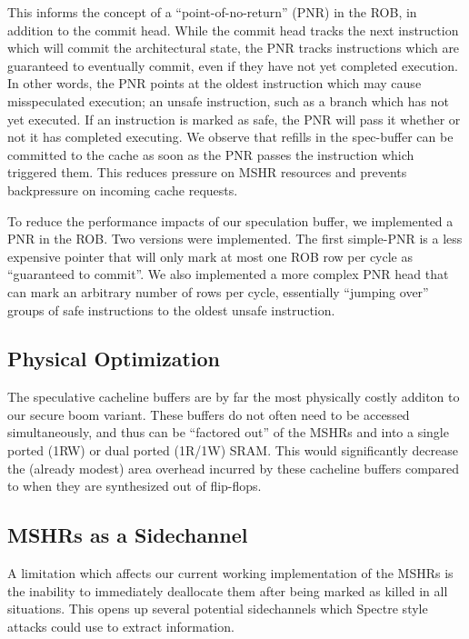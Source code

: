 This informs the concept of a ``point-of-no-return'' (PNR) in the ROB, in addition to the commit head. While the commit head tracks the next instruction which will commit the architectural state, the PNR tracks instructions which are guaranteed to eventually commit, even if they have not yet completed execution. In other words, the PNR points at the oldest instruction which may cause misspeculated execution; an unsafe instruction, such as a branch which has not yet executed. If an instruction is marked as safe, the PNR will pass it whether or not it has completed executing. We observe that refills in the spec-buffer can be committed to the cache as soon as the PNR passes the instruction which triggered them. This reduces pressure on MSHR resources and prevents backpressure on incoming cache requests.

To reduce the performance impacts of our speculation buffer, we implemented a PNR in the ROB. Two versions were implemented. The first simple-PNR is a less expensive pointer that will only mark at most one ROB row per cycle as ``guaranteed to commit''. We also implemented a more complex PNR head that can mark an arbitrary number of rows per cycle, essentially ``jumping over'' groups of safe instructions to the oldest unsafe instruction.

\subsection{Physical Optimization}
The speculative cacheline buffers are by far the most physically costly additon to our secure boom variant. These buffers do not often need to be accessed simultaneously, and thus can be ``factored out'' of the MSHRs and into a single ported (1RW) or dual ported (1R/1W) SRAM. This would significantly decrease the (already modest) area overhead incurred by these cacheline buffers compared to when they are synthesized out of flip-flops.

\subsection{MSHRs as a Sidechannel}
A limitation which affects our current working implementation of the MSHRs is the inability to immediately deallocate them after being marked as killed in all situations. This opens up several potential sidechannels which Spectre style attacks could use to extract information.

